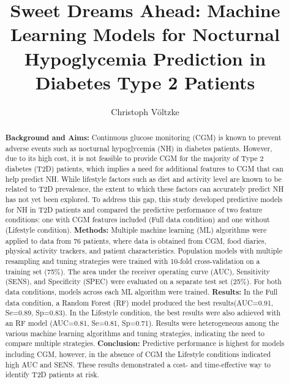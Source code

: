 \documentclass[Afour,sagev,times]{sagej}
\begin{document}

\title{Sweet Dreams Ahead: Machine Learning Models for Nocturnal Hypoglycemia Prediction in Diabetes Type 2 Patients}

\author{Christoph Völtzke}




\begin{abstract}
\textbf{Background and Aims:} Continuous glucose monitoring (CGM) is known to prevent adverse events such as nocturnal hypoglycemia (NH) in diabetes patients. However, due to its high cost, it is not feasible to provide CGM for the majority of Type 2 diabetes (T2D) patients, which implies a need for additional features to CGM that can help predict NH. While lifestyle factors such as diet and activity level are known to be related to T2D prevalence, the extent to which these factors can accurately predict NH has not yet been explored. To address this gap, this study developed predictive models for NH in T2D patients and compared the predictive performance of two feature conditions: one with CGM features included (Full data condition) and one without (Lifestyle condition).
\newline
\newline
\textbf{Methods:} Multiple machine learning (ML) algorithms were applied to data from 76 patients, where data is obtained from CGM, food diaries, physical activity trackers, and patient characteristics. Population models with multiple resampling and tuning strategies were trained with 10-fold cross-validation on a training set (75\%). The area under the receiver operating curve (AUC), Sensitivity (SENS), and Specificity (SPEC) were evaluated on a separate test set (25\%). For both data conditions, models across each ML algorithm were trained.
\newline
\newline
\textbf{Results:} In the Full data condition, a Random Forest (RF) model produced the best results(AUC=0.91, Se=0.89, Sp=0.83). In the Lifestyle condition, the best results were also achieved with an RF model (AUC=0.81, Se=0.81, Sp=0.71). Results were heterogeneous among the various machine learning algorithms and tuning strategies, indicating the need to compare multiple strategies.
\newline
\newline
\textbf{Conclusion:} Predictive performance is highest for models including CGM, however, in the absence of CGM the Lifestyle conditions indicated high AUC and SENS. These results demonstrated a cost- and time-effective way to identify T2D patients at risk.
\end{abstract}
\end{document}
